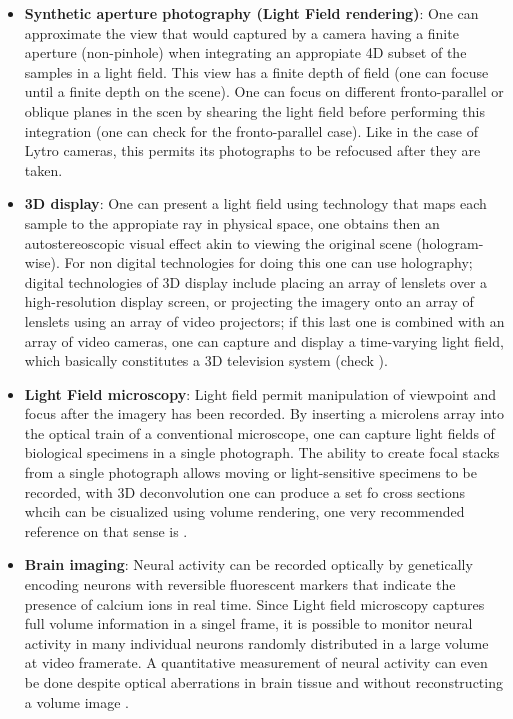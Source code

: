 \begin{itemize}
\item \textbf{Synthetic aperture photography (Light Field rendering)}: One can approximate the view that would captured by a camera having a finite aperture (non-pinhole) when integrating an appropiate 4D subset of the samples in a light field. This view has a finite depth of field (one can focuse until a finite depth on the scene). One can focus on different fronto-parallel or oblique planes in the scen by shearing the light field before performing this integration (one can check \cite{Isaksen} for the fronto-parallel case). Like in the case of Lytro cameras, this permits its photographs to be refocused after they are taken.

\item \textbf{3D display}: One can present a light field using technology that maps each sample to the appropiate ray in physical space, one obtains then an autostereoscopic visual effect akin to viewing the original scene (hologram-wise). For non digital technologies for doing this one can use holography; digital technologies of 3D display include placing an array of lenslets over a high-resolution display screen, or projecting the imagery onto an array of lenslets using an array of video projectors; if this last one is combined with an array of video cameras, one can capture and display a time-varying light field, which basically constitutes a 3D television system (check \cite{Javidi}).

\item \textbf{Light Field microscopy}: Light field permit manipulation of viewpoint and focus after the imagery has been recorded. By inserting a microlens array into the optical train of a conventional microscope, one can capture light fields of biological specimens in a single photograph. The ability to create focal stacks from a single photograph allows moving or light-sensitive specimens to be recorded, with 3D deconvolution one can produce a set fo cross sections whcih can be cisualized using volume rendering, one very recommended reference on that sense is \cite{Ng-micro}.

\item \textbf{Brain imaging}: Neural activity can be recorded optically by genetically encoding neurons with reversible fluorescent markers that indicate the presence of calcium ions in real time. Since Light field microscopy captures full volume information in a singel frame, it is possible to monitor neural activity in many individual neurons randomly distributed in a large volume at video framerate. A quantitative measurement of neural activity can even be done despite optical aberrations in brain tissue and without reconstructing a volume image \cite{Pegard}.


\end{itemize}
